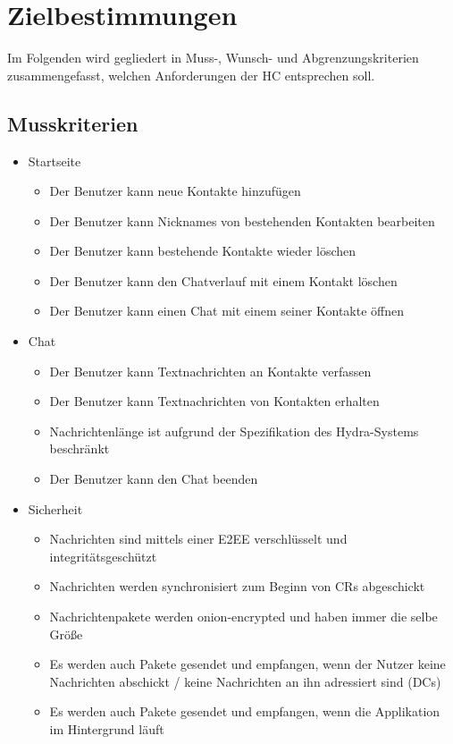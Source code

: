 \section{Zielbestimmungen}

Im Folgenden wird gegliedert in Muss-, Wunsch- und Abgrenzungskriterien zusammengefasst, welchen Anforderungen der \ac{HC} entsprechen soll.

\subsection{Musskriterien}
\begin{itemize}
	
	\item Startseite
	\begin{itemize}
		\item Der Benutzer kann neue Kontakte hinzufügen
		\item Der Benutzer kann Nicknames von bestehenden Kontakten bearbeiten
		\item Der Benutzer kann bestehende Kontakte wieder löschen
		\item Der Benutzer kann den Chatverlauf mit einem Kontakt löschen
		\item Der Benutzer kann einen Chat mit einem seiner Kontakte öffnen 
	\end{itemize}
	
	\item Chat
	\begin{itemize}
		\item Der Benutzer kann Textnachrichten an Kontakte verfassen
		\item Der Benutzer kann Textnachrichten von Kontakten erhalten
		\item Nachrichtenlänge ist aufgrund der Spezifikation des Hydra-Systems beschränkt
		\item Der Benutzer kann den Chat beenden
	\end{itemize}
	
	\item Sicherheit
	\begin{itemize}
		\item Nachrichten sind mittels einer \ac{E2EE} verschlüsselt und integritätsgeschützt
		\item Nachrichten werden synchronisiert zum Beginn von \acp{CR} abgeschickt
		\item Nachrichtenpakete werden onion-encrypted und haben immer die selbe Größe
		\item Es werden auch Pakete gesendet und empfangen, wenn der Nutzer keine Nachrichten abschickt / keine Nachrichten an ihn adressiert sind (\acp{DC})
		\item Es werden auch Pakete gesendet und empfangen, wenn die Applikation im Hintergrund läuft
	\end{itemize}
	

\end{itemize}
